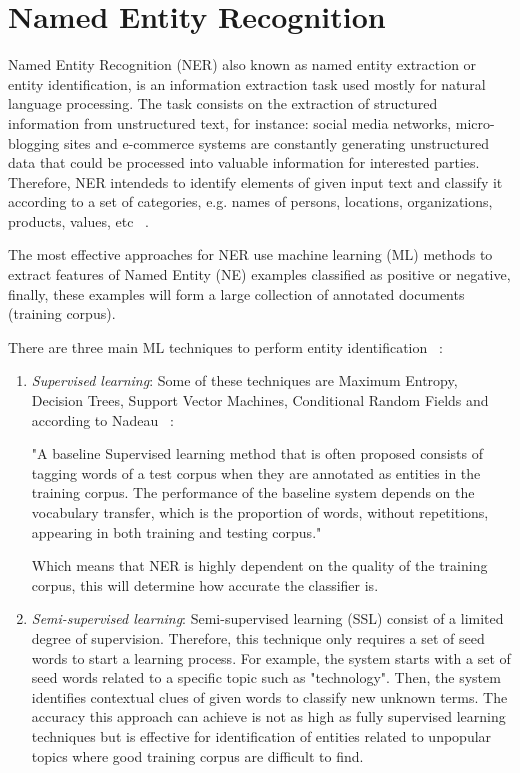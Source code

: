 {    \section{Named Entity Recognition}
    \label{sec:ner}
    
    Named Entity Recognition (NER) also known as named entity extraction or entity identification, is an information extraction task used mostly for natural language processing. The task consists on the extraction of structured information from unstructured text, for instance: social media networks, micro-blogging sites and e-commerce systems are constantly generating unstructured data that could be processed into valuable information for interested parties. Therefore, NER intendeds to identify elements of given input text and classify it according to a set of categories, e.g. names of persons, locations, organizations, products, values, etc ~\cite[p. 1]{nadeau2007survey}. 
    
    The most effective approaches for NER use machine learning (ML) methods to extract features of Named Entity (NE) examples classified as positive or negative, finally, these examples will form a large collection of annotated documents (training corpus).   
    
    There are three main ML techniques to perform entity identification  ~\cite[p. 4]{nadeau2007survey}:
    
    \begin{enumerate}
        \item \textit{Supervised learning}: Some of these techniques are Maximum Entropy, Decision Trees, Support Vector Machines, Conditional Random Fields and according to Nadeau ~\cite[p. 4]{nadeau2007survey}:
        \begin{displayquote}
            "A baseline Supervised learning method that is often proposed consists of tagging words of a test corpus when they are annotated as entities in the training corpus. The performance of the baseline system depends on the vocabulary transfer, which is the proportion of words, without repetitions, appearing in both training and testing corpus."
        \end{displayquote}
        Which means that NER is highly dependent on the quality of the training corpus, this will determine how accurate the classifier is.  
        
        \item \textit{Semi-supervised learning}: Semi-supervised learning (SSL) consist of a limited degree of supervision. Therefore, this technique only requires a set of seed words to start a learning process. For example, the system starts with a set of seed words related to a specific topic such as "technology". Then, the system identifies contextual clues of given words to classify new unknown terms. The accuracy this approach can achieve is not as high as fully supervised learning techniques but is effective for identification of entities related to unpopular topics where good training corpus are difficult to find. 
            

\end{enumerate}}
